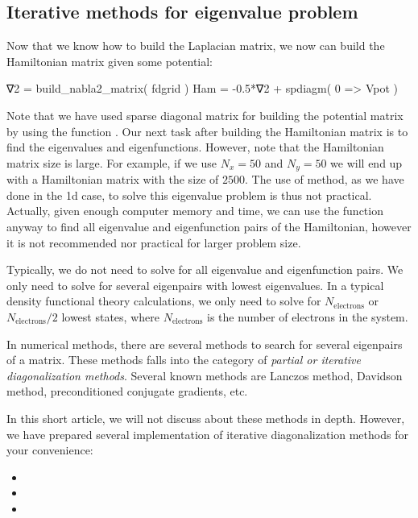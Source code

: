 \subsection{Iterative methods for eigenvalue problem}

Now that we know how to build the Laplacian matrix, we now can build the Hamiltonian
matrix given some potential:
\begin{juliacode}
∇2 = build_nabla2_matrix( fdgrid )
Ham = -0.5*∇2 + spdiagm( 0 => Vpot )
\end{juliacode}
Note that we have used sparse diagonal matrix for building the potential matrix by
using the function .
Our next task after building the Hamiltonian matrix is to find the eigenvalues
and eigenfunctions.
However, note that the Hamiltonian matrix size is large.
For example, if we use $N_x=50$ and $N_y=50$ we will end up with a Hamiltonian
matrix with the size of $2500$.
The use of  method, as we have done in the 1d case,
to solve this eigenvalue problem is thus not practical.
Actually, given enough computer memory and time, we can use the function
 anyway to find all eigenvalue and eigenfunction pairs of
the Hamiltonian, however it is not recommended
nor practical for larger problem size.

Typically, we do not need to solve for all eigenvalue and eigenfunction pairs.
We only need to solve for several eigenpairs with lowest eigenvalues. In a typical density
functional theory calculations, we only need to solve for $N_{\mathrm{electrons}}$ or
$N_{\mathrm{electrons}}/2$ lowest states, where $N_{\mathrm{electrons}}$ is the number
of electrons in the system.

In numerical methods, there are several methods to search for several eigenpairs
of a matrix. These methods falls into the category of \textit{partial or iterative
diagonalization methods}. Several known methods are Lanczos method, Davidson method,
preconditioned conjugate gradients, etc.

In this short article, we will not discuss about these methods in depth.
However, we have prepared several implementation of iterative diagonalization methods
for your convenience:
\begin{itemize}
\item {}
\item {}
\item {}
\end{itemize}

